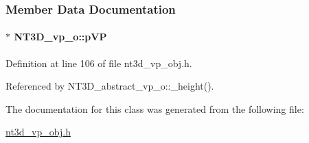 \subsubsection{Member Data Documentation}
\paragraph[{pVP}]{$\ast$ {\bf NT3D\_\-vp\_\-o::pVP}}\hfill\label{class_n_t3_d__vp__o_aaaa3b44750458437868554d64b05373f}


Definition at line 106 of file nt3d\_\-vp\_\-obj.h.



Referenced by NT3D\_\-abstract\_\-vp\_\-o::\_\-height().



The documentation for this class was generated from the following file:\begin{DoxyCompactItemize}
\item 
\hyperlink{nt3d__vp__obj_8h}{nt3d\_\-vp\_\-obj.h}\end{DoxyCompactItemize}
